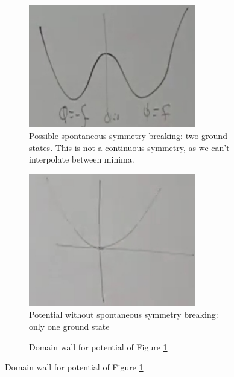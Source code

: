 \documentclass[]{article}
\begin{document}
\begin{figure}[H]
	\caption[$V(\Phi)$ with and without spontaneous symmetry breaking]{Potential for (\ref{eq:spontaneous:symmetry:L}), with and without spontaneous symmetry breaking}
	\begin{subfigure}[t]{0.45\textwidth}
		\vskip 0pt
		\caption{Possible spontaneous symmetry breaking: two ground states. This is not a continuous symmetry, as we can't interpolate between minima.}\label{fig:2-7-V}
		\includegraphics[width=0.8\textwidth]{2-7-V}
	\end{subfigure}
	\hfill
	\begin{subfigure}[t]{0.45\textwidth}
		\vskip 0pt
		\caption{Potential without spontaneous symmetry breaking: only one ground state}\label{fig:2-7-V-simple}
		\includegraphics[width=0.8\textwidth]{2-7-V-simple}
	\end{subfigure}
	\hfill
	\begin{subfigure}{0.9\textwidth}
		\begin{center}
			\caption{Domain wall for potential of Figure \ref{fig:2-7-V}}\label{fig:2-7-V-domain-wall}

\end{center}
\end{subfigure}
\end{figure}
\end{document}
